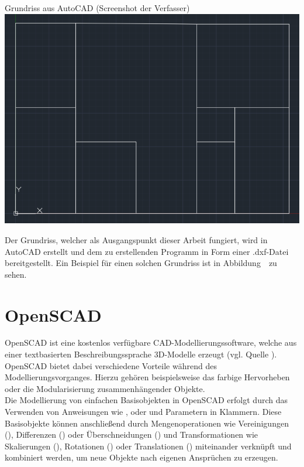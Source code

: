 \begin{Bild}{Grundriss aus AutoCAD (Screenshot der Verfasser)}
	\includegraphics[width=\textwidth]{Bilder/Grundriss}
\end{Bild}

Der Grundriss, welcher als Ausgangspunkt dieser Arbeit fungiert, wird in AutoCAD erstellt und dem zu erstellenden Programm in Form einer .dxf-Datei bereitgestellt.
Ein Beispiel für einen solchen Grundriss ist in Abbildung~\thebildnr\ zu sehen.

\section{OpenSCAD}
OpenSCAD ist eine kostenlos verfügbare CAD-Modellierungssoftware, welche aus einer textbasierten Beschreibungssprache 3D-Modelle erzeugt (vgl. Quelle \cite{OpenScad}).
OpenSCAD bietet dabei verschiedene Vorteile während des Modellierungsvorganges.
Hierzu gehören beispielsweise das farbige Hervorheben oder die Modularisierung zusammenhängender Objekte. \\

Die Modellierung von einfachen Basisobjekten in OpenSCAD erfolgt durch das Verwenden von Anweisungen wie ,  oder  und Parametern in Klammern.
Diese Basisobjekte können anschließend durch Mengenoperationen wie Vereinigungen (), Differenzen () oder Überschneidungen () und Transformationen wie Skalierungen (), Rotationen () oder Translationen () miteinander verknüpft und kombiniert werden, um neue Objekte nach eigenen Ansprüchen zu erzeugen.

